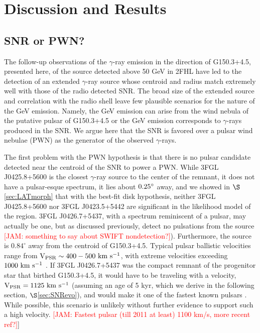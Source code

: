 \documentclass[iop]{emulateapj}
\newcommand{\kibitz}[2]{\ifnum\Comments=1\textcolor{#1}{#2}\fi}
\newcommand{\jamie}[1]{\kibitz{red}      {[JAM: #1]}}
\newcommand{\gam}{$\gamma$-ray}
\newcommand{\Gone}{G150.3+4.5}
\newcommand{\psrLike}{3FGL J0426.7+5437}
\begin{document}
\section{Discussion and Results}\label{sec:Discuss}
\subsection{SNR or PWN?}\label{sec:PWNvsSNR}

The follow-up observations of the \gam{} emission in the direction of \Gone{}, presented here, of the source detected above 50 GeV in 2FHL have led to the detection of an extended \gam{} source whose centroid and radius match extremely well with those of the radio detected SNR. The broad size of the extended source and correlation with the radio shell leave few plausible scenarios for the nature of the GeV emission. Namely, the GeV emission can arise from the wind nebula of the putative pulsar of \Gone{} or the GeV emission corresponds to \gam{}s produced in the SNR. We argue here that the SNR is favored over a pulsar wind nebulae (PWN) as the generator of the observed \gam{}s.

The first problem with the PWN hypothesis is that there is no pulsar candidate detected near the centroid of the SNR to power a PWN. While 3FGL J0425.8+5600 is the closest \gam{} source to the center of the remnant, it does not have a pulsar-esque spectrum, it lies about ${\rm 0.25^\circ }$ away, and we showed in $\S$\ref{sec:LATmorph} that with the best-fit disk hypothesis, neither 3FGL J0425.8+5600 nor 3FGL J0423.5+5442 are significant in the likelihood model of the region. \psrLike{}, with a spectrum reminiscent of a pulsar,  may actually be one, but as discussed previously, \cite{Barr13} detect no pulsations from the source \jamie{something to say about SWIFT nondetection?}). Furthermore, the source is $0.84^\circ$ away from the centroid of \Gone{}. Typical pulsar ballistic velocities range from ${\rm V_{PSR} \sim 400-500~km~s^{-1}}$, with extreme velocities exceeding ${\rm 1000~km~s^{-1}}$ \citep{Gaensler06}. If \psrLike{} was the compact remnant of the progenitor star that birthed \Gone{}, it would have to be traveling with a velocity, ${\rm V_{PSR} = 1125~km~s^{-1}}$ (assuming an age of 5 kyr, which we derive in the following section, $\S$\ref{sec:SNRevo}), and would make it one of the fastest known pulsars \citep{Chatterjee05}. While possible, this scenario is unlikely without further evidence to support such a high velocity. \jamie{Fastest pulsar (till 2011 at least) 1100 km/s, more recent ref?}]
\end{document}
